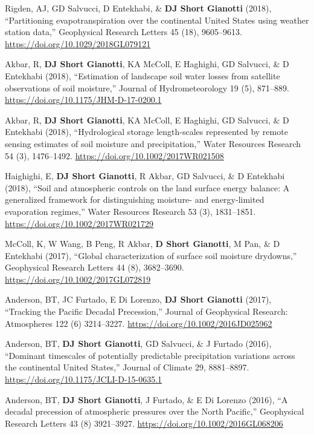 \documentclass[10pt, a4paper]{article}
\newcommand{\lbr}{\vspace*{12pt}}
\newcommand{\years}[1]{\mbox{}\marginnote{\scriptsize #1}} %
\begin{document}
\years{2018d}Rigden, AJ, GD Salvucci, D Entekhabi, \& \textbf{DJ Short Gianotti} (2018), ``Partitioning evapotranspiration over the continental United States using weather station data,'' Geophysical Research Letters 45 (18), 9605--9613. \url{https://doi.org/10.1029/2018GL079121} \lbr

\years{2018c}Akbar, R, \textbf{DJ Short Gianotti}, KA McColl, E Haghighi, GD Salvucci, \& D Entekhabi (2018), ``Estimation of landscape soil water losses from satellite observations of soil moisture,'' Journal of Hydrometeorology 19 (5), 871--889. \url{https://doi.org/10.1175/JHM-D-17-0200.1} \lbr

\years{2018b}Akbar, R, \textbf{DJ Short Gianotti}, KA McColl, E Haghighi, GD Salvucci, \& D Entekhabi (2018), ``Hydrological storage length-scales represented by remote sensing estimates of soil moisture and precipitation,'' Water Resources Research 54 (3), 1476--1492. \url{ https://doi.org/10.1002/2017WR021508}\lbr

\years{2018a}Haighighi, E, \textbf{DJ Short Gianotti}, R Akbar, GD Salvucci, \& D Entekhabi (2018), ``Soil and atmospheric controls on the land surface energy balance: A generalized framework for distinguishing moisture- and energy-limited evaporation regimes,'' Water Resources Research 53 (3), 1831--1851. \url{https://doi.org/10.1002/2017WR021729} \lbr

\years{2017b}McColl, K, W Wang, B Peng, R Akbar, \textbf{D Short Gianotti}, M Pan, \& D Entekhabi (2017), ``Global characterization of surface soil moisture drydowns,'' Geophysical Research Letters 44 (8), 3682--3690. \url{https://doi.org/10.1002/2017GL072819} \lbr

\years{2017a}Anderson, BT, JC Furtado, E Di Lorenzo, \textbf{DJ Short Gianotti} (2017), ``Tracking the Pacific Decadal Precession,'' Journal of Geophysical Research: Atmospheres 122 (6) 3214--3227. \url{https://doi.org/10.1002/2016JD025962} \lbr

\years{2016b}Anderson, BT, \textbf{DJ Short Gianotti}, GD Salvucci, \& J Furtado (2016), ``Dominant timescales of potentially predictable precipitation variations across the continental United States,'' Journal of Climate 29, 8881--8897. \url{https://doi.org/10.1175/JCLI-D-15-0635.1} \lbr

\years{2016a}Anderson, BT, \textbf{DJ Short Gianotti}, J Furtado, \& E Di Lorenzo (2016), ``A decadal precession of atmospheric pressures over the North Pacific,'' Geophysical Research Letters 43 (8) 3921--3927. \url{https://doi.org/10.1002/2016GL068206} \lbr
\end{document}
